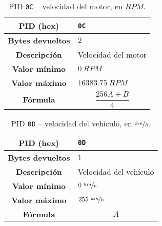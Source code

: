 \begin{table}[H]
  \centering
  \begin{tabularx}{\textwidth}{|c|X|}
    \hline
    \textbf{PID (hex)}       & \texttt{0C}         \\
    \hline
    \textbf{Bytes devueltos} & $2$                 \\
    \hline
    \textbf{Descripción}     & Velocidad del motor \\
    \hline
    \textbf{Valor mínimo}    & $0~RPM$             \\
    \hline
    \textbf{Valor máximo}    & $16383.75~RPM$      \\
    \hline
    \textbf{Fórmula}         &                     %
    \begin{equation*}
      \frac{256A + B}{4}
    \end{equation*}                      \\
    \hline
  \end{tabularx}
  \caption{\ac{PID} \texttt{0C} -- velocidad del motor, en $RPM$.}
\end{table}

\begin{table}[H]
  \centering
  \begin{tabularx}{\textwidth}{|c|X|}
    \hline
    \textbf{PID (hex)}       & \texttt{0D}            \\
    \hline
    \textbf{Bytes devueltos} & $1$                    \\
    \hline
    \textbf{Descripción}     & Velocidad del vehículo \\
    \hline
    \textbf{Valor mínimo}    & $0~\nicefrac{km}{h}$   \\
    \hline
    \textbf{Valor máximo}    & $255~\nicefrac{km}{h}$ \\
    \hline
    \textbf{Fórmula}         &                        %
    \begin{equation*}
      A
    \end{equation*}                         \\
    \hline
  \end{tabularx}
  \caption{\ac{PID} \texttt{0D} -- velocidad del vehículo, en $\nicefrac{km}{h}$.}
\end{table}

